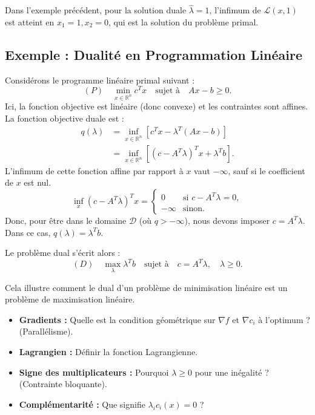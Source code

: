 \begin{remarque}
    Dans l'exemple précédent, pour la solution duale $\hat{\lambda} = 1$, l'infimum de $\mathcal{L}(x, 1)$ est atteint en $x_1 = 1, x_2 = 0$, qui est la solution du problème primal.
\end{remarque}

\subsection{Exemple : Dualité en Programmation Linéaire}

Considérons le programme linéaire primal suivant :
\begin{equation}
    (P) \quad \min_{x \in \mathbb{R}^n} c^T x \quad \text{sujet à} \quad Ax - b \geq 0.
\end{equation}
Ici, la fonction objective est linéaire (donc convexe) et les contraintes sont affines. La fonction objective duale est :
\begin{align}
    q(\lambda) &= \inf_{x \in \mathbb{R}^n} \left[ c^T x - \lambda^T (Ax - b) \right] \\
    &= \inf_{x \in \mathbb{R}^n} \left[ (c - A^T \lambda)^T x + \lambda^T b \right].
\end{align}
L'infimum de cette fonction affine par rapport à $x$ vaut $-\infty$, sauf si le coefficient de $x$ est nul.
\begin{equation}
    \inf_x (c - A^T \lambda)^T x = \begin{cases} 0 & \text{si } c - A^T \lambda = 0, \\ -\infty & \text{sinon.} \end{cases}
\end{equation}
Donc, pour être dans le domaine $\mathcal{D}$ (où $q > -\infty$), nous devons imposer $c = A^T \lambda$. Dans ce cas, $q(\lambda) = \lambda^T b$.

Le problème dual s'écrit alors :
\begin{equation}
    (D) \quad \max_{\lambda} \lambda^T b \quad \text{sujet à} \quad c = A^T \lambda, \quad \lambda \geq 0.
\end{equation}

Cela illustre comment le dual d'un problème de minimisation linéaire est un problème de maximisation linéaire.

\bigskip
\begin{checkpoint}
\begin{itemize}
    \item \textbf{Gradients :} Quelle est la condition géométrique sur $\nabla f$ et $\nabla c_i$ à l'optimum ? (Parallélisme).
    \item \textbf{Lagrangien :} Définir la fonction Lagrangienne.
    \item \textbf{Signe des multiplicateurs :} Pourquoi $\lambda \ge 0$ pour une inégalité ? (Contrainte bloquante).
    \item \textbf{Complémentarité :} Que signifie $\lambda_i c_i(x) = 0$ ?
\end{itemize}
\end{checkpoint}

